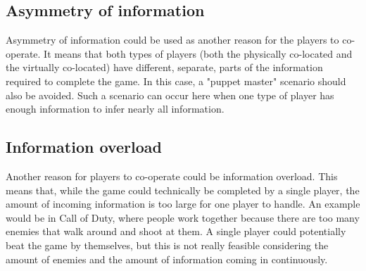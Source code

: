 		\subsection{Asymmetry of information}
			Asymmetry of information could be used as another reason for the
			players to co-operate. It means that both types of players (both the
			physically co-located and the virtually co-located) have different,
			separate, parts of the information required to complete the game. In
			this case, a "puppet master" scenario should also be avoided. Such a
			scenario can occur here when one type of player has enough
			information to infer nearly all information.

		\subsection{Information overload}
			Another reason for players to co-operate could be information
			overload. This means that, while the game could technically be
			completed by a single player, the amount of incoming information is
			too large for one player to handle. An example would be in Call of
			Duty, where people work together because there are too many enemies
			that walk around and shoot at them. A single player could
			potentially beat the game by themselves, but this is not really
			feasible considering the amount of enemies and the amount of
			information coming in continuously.

	
